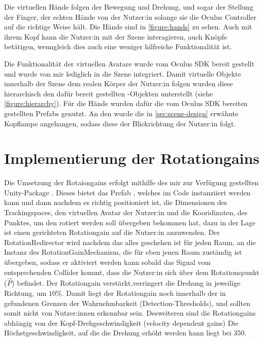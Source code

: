Die virtuellen Hände folgen der Bewegung und Drehung, und sogar der Stellung der Finger, der echten Hände von der Nutzer:in solange sie die Oculus Controller auf die richtige Weise hält. Die Hände sind in \autoref{figure:hands} zu sehen.
Auch mit ihrem Kopf kann die Nutzer:in mit der Szene interagieren, auch Knöpfe betätigen, wenngleich dies auch eine weniger hilfreiche Funktionalität ist.

Die Funktionalität der virtuellen Avatare wurde vom Oculus SDK bereit gestellt und wurde von mir lediglich in die Szene integriert. %
Damit virtuelle Objekte innerhalb der Szene dem realen Körper der Nutzer:in folgen wurden diese hierarchisch den dafür bereit gestellten -Objekten unterstellt (siehe \autoref{figure:hierarchy}). Für die Hände wurden dafür die vom Oculus SDK bereiten gestellten Prefabs genutzt. %
An den  wurde die in \autoref{sec:scene-design} erwähnte Kopflampe angehangen, sodass diese der Blickrichtung der Nutzer:in folgt.

\section{Implementierung der Rotationgains}

Die Umsetzung der Rotaiongains erfolgt mithilfe des mir zur Verfügung gestellten Unity-Package . Dieses bietet das Prefab , welches im Code instanziiert werden kann und dann nachdem es richtig positioniert ist, die Dimensionen des Trackingspaces, den virtuellen Avatar der Nutzer:in und die Kooridinaten, des Punktes, um den rotiert werden soll übergeben bekommen hat, dazu in der Lage ist einen gerichteten Rotationgain auf die Nutzer:in anzuwenden. Der RotationRedirector wird nachdem das alles geschehen ist für jeden Raum, an die Instanz des RotationGainMechanism, die für eben jenen Raum zuständig ist übergeben, sodass er aktiviert werden kann sobald das Signal vom entsprechenden Collider kommt, dass die Nutzer:in sich über dem Rotationspunkt ($\vec{P}$) befindet.
Der Rotationgain verstärkt,verringert die Drehung in jeweilige Richtung, um $10\%$. Damit liegt der Rotationgain noch innerhalb der in \cite{detection-thresholds} gefundenen Grenzen der Wahrnehmbarkeit (Detection-Thresholds), und sollten somit nicht von Nutzer:innen erkennbar sein.
Desweiteren sind die Rotationgains abhängig von der Kopf-Drehgeschwindigkeit (velocity dependent gains) %
Die Höchstgeschwindigkeit, auf die die Drehung erhöht werden kann liegt bei 350.

